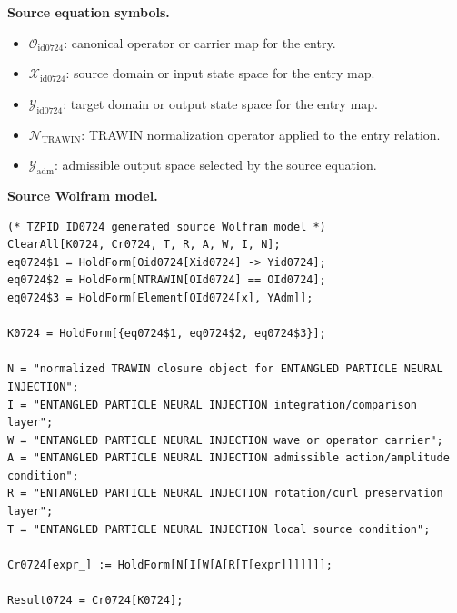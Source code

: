\begin{minipage}[t]{0.49\linewidth}
\begingroup
\small
\raggedright
\textbf{Source equation symbols.}\par
\begin{itemize}[leftmargin=1.35em,itemsep=1pt,topsep=1pt,parsep=0pt]
    \item $\mathcal{O}_{\mathrm{id0724}}$: canonical operator or carrier map for the entry.
    \item $\mathcal{X}_{\mathrm{id0724}}$: source domain or input state space for the entry map.
    \item $\mathcal{Y}_{\mathrm{id0724}}$: target domain or output state space for the entry map.
    \item $\mathcal{N}_{\mathrm{TRAWIN}}$: TRAWIN normalization operator applied to the entry relation.
    \item $\mathcal{Y}_{\mathrm{adm}}$: admissible output space selected by the source equation.
\end{itemize}
\endgroup
\end{minipage}\hfill
\begin{minipage}[t]{0.47\linewidth}
\begingroup
\scriptsize
\raggedright
\textbf{Source Wolfram model.}\par
\begin{Verbatim}[fontsize=\tiny,breaklines=true,breakanywhere=true]
(* TZPID ID0724 generated source Wolfram model *)
ClearAll[K0724, Cr0724, T, R, A, W, I, N];
eq0724$1 = HoldForm[Oid0724[Xid0724] -> Yid0724];
eq0724$2 = HoldForm[NTRAWIN[OId0724] == OId0724];
eq0724$3 = HoldForm[Element[OId0724[x], YAdm]];

K0724 = HoldForm[{eq0724$1, eq0724$2, eq0724$3}];

N = "normalized TRAWIN closure object for ENTANGLED PARTICLE NEURAL INJECTION";
I = "ENTANGLED PARTICLE NEURAL INJECTION integration/comparison layer";
W = "ENTANGLED PARTICLE NEURAL INJECTION wave or operator carrier";
A = "ENTANGLED PARTICLE NEURAL INJECTION admissible action/amplitude condition";
R = "ENTANGLED PARTICLE NEURAL INJECTION rotation/curl preservation layer";
T = "ENTANGLED PARTICLE NEURAL INJECTION local source condition";

Cr0724[expr_] := HoldForm[N[I[W[A[R[T[expr]]]]]]];

Result0724 = Cr0724[K0724];
\end{Verbatim}
\endgroup
\end{minipage}

